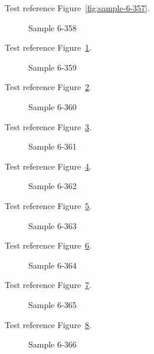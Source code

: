 Test reference Figure~\ref{fig:sample-6-357}.

\begin{figure}[tbhp]
\caption{Sample 6-358}
\label{fig:sample-6-358}
\end{figure}

Test reference Figure~\ref{fig:sample-6-358}.

\begin{figure}[tbhp]
\caption{Sample 6-359}
\label{fig:sample-6-359}
\end{figure}

Test reference Figure~\ref{fig:sample-6-359}.

\begin{figure}[tbhp]
\caption{Sample 6-360}
\label{fig:sample-6-360}
\end{figure}

Test reference Figure~\ref{fig:sample-6-360}.

\begin{figure}[tbhp]
\caption{Sample 6-361}
\label{fig:sample-6-361}
\end{figure}

Test reference Figure~\ref{fig:sample-6-361}.

\begin{figure}[tbhp]
\caption{Sample 6-362}
\label{fig:sample-6-362}
\end{figure}

Test reference Figure~\ref{fig:sample-6-362}.

\begin{figure}[tbhp]
\caption{Sample 6-363}
\label{fig:sample-6-363}
\end{figure}

Test reference Figure~\ref{fig:sample-6-363}.

\begin{figure}[tbhp]
\caption{Sample 6-364}
\label{fig:sample-6-364}
\end{figure}

Test reference Figure~\ref{fig:sample-6-364}.

\begin{figure}[tbhp]
\caption{Sample 6-365}
\label{fig:sample-6-365}
\end{figure}

Test reference Figure~\ref{fig:sample-6-365}.

\begin{figure}[tbhp]
\caption{Sample 6-366}
\label{fig:sample-6-366}
\end{figure}

